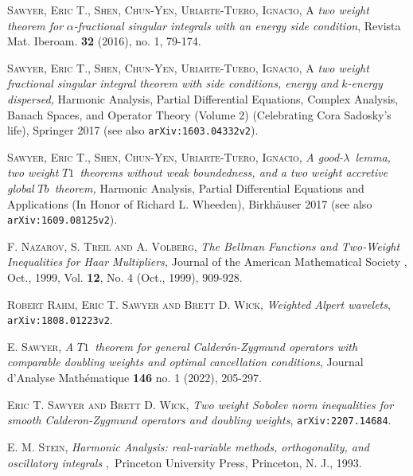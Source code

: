 \documentclass{amsart}%
\theoremstyle{plain}
\numberwithin{equation}{section}
\begin{document}
\begin{thebibliography}{999999999}
\textsc{Sawyer, Eric T., Shen, Chun-Yen,
Uriarte-Tuero, Ignacio,} A \textit{two weight theorem for }$\alpha
$\textit{-fractional singular integrals with an energy side condition},
Revista Mat. Iberoam. \textbf{32} (2016), no. 1, 79-174.

\textsc{Sawyer, Eric T., Shen, Chun-Yen,
Uriarte-Tuero, Ignacio,} A \textit{two weight fractional singular integral
theorem with side conditions, energy and }$k$\textit{-energy dispersed,}
Harmonic Analysis, Partial Differential Equations, Complex Analysis, Banach
Spaces, and Operator Theory (Volume 2) (Celebrating Cora Sadosky's life),
Springer 2017 (see also \texttt{arXiv:1603.04332v2}).

\textsc{Sawyer, Eric T., Shen, Chun-Yen,
Uriarte-Tuero, Ignacio,} \textit{A good-}$\lambda$\textit{\ lemma, two weight
}$T1$\textit{\ theorems without weak boundedness, and a two weight accretive
global }$Tb$\textit{\ theorem,} Harmonic Analysis, Partial Differential
Equations and Applications (In Honor of Richard L. Wheeden), Birkh\"{a}user
2017 (see also \texttt{arXiv:1609.08125v2}).

\textsc{F. Nazarov, S. Treil and A. Volberg,} \textit{The Bellman Functions and Two-Weight Inequalities for Haar Multipliers, }Journal of the American Mathematical Society , Oct., 1999, Vol. \textbf{12}, No. 4 (Oct., 1999), 909-928.

\textsc{Robert Rahm, Eric T. Sawyer and Brett D.
Wick,} \textit{Weighted Alpert wavelets}, \texttt{arXiv:1808.01223v2}.

\textsc{E. Sawyer}, \textit{A }$T1$\textit{\ theorem for
general Calder\'{o}n-Zygmund operators with comparable doubling weights and
optimal cancellation conditions}, Journal d'Analyse Math\'{e}matique
\textbf{146} no. 1 (2022), 205-297.

\textsc{Eric T. Sawyer and Brett D. Wick,} \textit{Two
weight Sobolev norm inequalities for smooth Calderon-Zygmund operators and
doubling weights}, \texttt{arXiv:2207.14684}.

\textsc{E. M. Stein,} \textit{Harmonic Analysis:
real-variable methods, orthogonality, and oscillatory integrals}%
,\textit{\ }Princeton University Press, Princeton, N. J., 1993.

\end{thebibliography}
\end{document}
